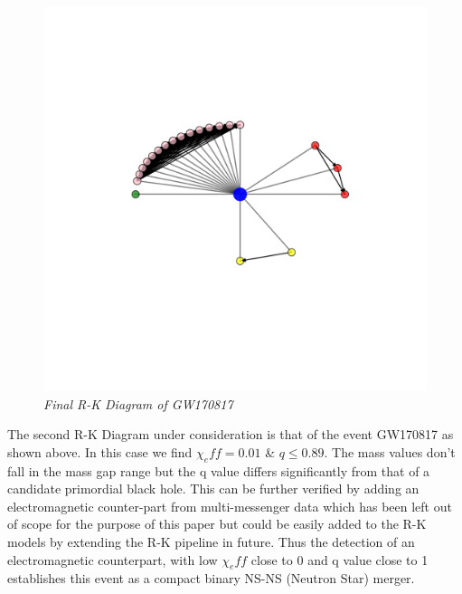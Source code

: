     \begin{figure}[H]
        \centering
        \includegraphics[width=1.0\linewidth]{images/GW170817_RK_Diagram.png}
        \caption{\textit{Final R-K Diagram of GW170817}}
        \label{fig:LIGO14_PlaceHolder2_fig}
    \end{figure}

The second R-K Diagram under consideration is that of the event GW170817 as shown above. In this case we find $\chi_eff = 0.01$ \&  $q\le 0.89$. The mass values don't fall in the mass gap range but the q value differs significantly from that of a candidate primordial black hole. This can be further verified by adding an electromagnetic counter-part from multi-messenger data which has been left out of scope for the purpose of this paper but could be easily added to the R-K models by extending the R-K pipeline in future. Thus the detection of an electromagnetic counterpart, with low $\chi_eff$ close to 0 and q value close to 1 establishes this event as a compact binary NS-NS (Neutron Star) merger.


